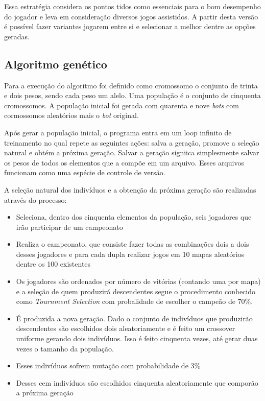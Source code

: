 \documentclass[a4paper,titlepage,11pt]{article}
\begin{document}
Essa estratégia considera os pontos tidos como essenciais para o bom desempenho do jogador e leva em consideração diversos jogos assistidos. A partir desta versão é possível fazer variantes jogarem entre si e selecionar a melhor dentre as opções geradas.


\subsection{Algoritmo genético}
Para a execução do algoritmo foi definido como cromossomo o conjunto de trinta e dois pesos, sendo cada peso um alelo. Uma população é o conjunto de cinquenta cromossomos. A população inicial foi gerada com quarenta e nove {\em bots} com cormossomos aleatórios mais o {\em bot} original.

Após gerar a população inicial, o programa entra em um loop infinito de treinamento no qual repete as seguintes ações: salva a geração, promove a seleção natural e obtém a próxima geração. Salvar a geração signiica simplesmente salvar os pesos de todos os elementos que a compõe em um arquivo. Esses arquivos funcionam como uma espécie de controle de versão.

A seleção natural dos indivíduos e a obtenção da próxima geração são realizadas através do processo:
\begin{itemize}
	\item Seleciona, dentro dos cinquenta elementos da população, seis jogadores que irão participar de um campeonato
	\item Realiza o campeonato, que consiste fazer todas as combinações dois a dois desses jogadores e para cada dupla realizar jogos em 10 mapas aleatórios dentre os 100 existentes 
	\item Os jogadores são ordenados por número de vitórias (contando uma por mapa) e a seleção de quem produzirá descendentes segue o procedimento conhecido como {\em Tournment Selection} com probalidade de escolher o campeão de 70\%.
	\item É produzida a nova geração. Dado o conjunto de indivíduos que produzirão descendentes são escolhidos dois aleatoriamente e é feito um crossover uniforme gerando dois indivíduos. Isso é feito cinquenta vezes, até gerar duas vezes o tamanho da população. 
	\item Esses indivíduos sofrem mutação com probabilidade de 3\%
	\item Desses cem indivíduos são escolhidos cinquenta aleatoriamente que comporão a próxima geração
\end{itemize}
\end{document}
